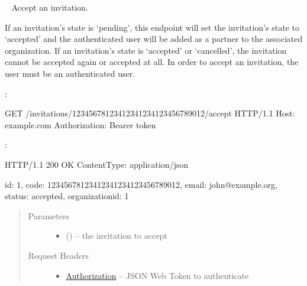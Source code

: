 \documentclass[letterpaper,10pt,english]{sphinxmanual}
\begin{document}
\begin{fulllineitems}
\label{\detokenize{resources/invitation:get--invitations-(code)-accept}}~
Accept an invitation.

If an invitation's state is `pending', this endpoint will set the
invitation's state to `accepted' and the authenticated user will be
added as a partner to the associated organization. If an invitation's
state is `accepted' or `cancelled', the invitation cannot be
accepted again or accepted at all. In order to accept an invitation,
the user must be an authenticated user.

:

\begin{sphinxVerbatim}[commandchars=\\\{\}]
GET /invitations/12345678\PYGZhy{}1234\PYGZhy{}1234\PYGZhy{}1234\PYGZhy{}123456789012/accept
HTTP/1.1
Host: example.com
Authorization: Bearer \PYGZlt{}token\PYGZgt{}
\end{sphinxVerbatim}

:

\begin{sphinxVerbatim}[commandchars=\\\{\}]
HTTP/1.1 200 OK
Content\PYGZhy{}Type: application/json

\PYGZob{}
    \PYGZsq{}id\PYGZsq{}: 1,
    \PYGZsq{}code\PYGZsq{}: \PYGZsq{}12345678\PYGZhy{}1234\PYGZhy{}1234\PYGZhy{}1234\PYGZhy{}123456789012\PYGZsq{},
    \PYGZsq{}email\PYGZsq{}: \PYGZsq{}john@example.org\PYGZsq{},
    \PYGZsq{}status\PYGZsq{}: \PYGZsq{}accepted\PYGZsq{},
    \PYGZsq{}organization\PYGZus{}id\PYGZsq{}: 1
\PYGZcb{}
\end{sphinxVerbatim}
\begin{quote}\begin{description}
\item[{Parameters}] \leavevmode\begin{itemize}
\item {} 
 () -- the invitation to accept

\end{itemize}

\item[{Request Headers}] \leavevmode\begin{itemize}
\item {} 
\href{http://tools.ietf.org/html/rfc7235\#section-4.2}{Authorization} -- JSON Web Token to authenticate


\end{itemize}
\end{description}
\end{quote}
\end{fulllineitems}
\end{document}
